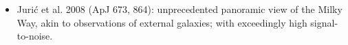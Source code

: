 \documentclass[letterpaper,landscape]{slides}
\begin{document}
\begin{slide}
{\begin{minipage}[t]{16cm}
\begin{itemize}
\item Juri\'{c} et al. 2008 (ApJ 673, 864): {\color{blue} unprecedented 
panoramic view of the Milky Way, akin to observations of external galaxies;}
with exceedingly high signal-to-noise.
\end{itemize}     
\vskip -0.3in
\vskip -0.05in

\end{minipage}}
\vfill 
\end{slide}
\end{document}
